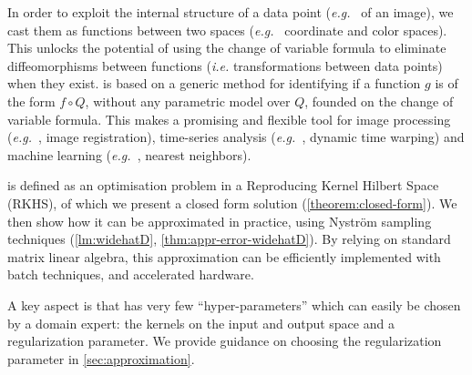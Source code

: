 In order to exploit the internal structure of a data point (\emph{e.g.\ } of an image), we cast them as functions between two spaces (\emph{e.g.\ } coordinate and color spaces). This unlocks the potential of using the change of variable formula to eliminate diffeomorphisms between functions (\emph{i.e.} transformations between data points) when they exist. \Diffy is based on a generic method for identifying if a function $g$ is of the form $f\circ Q$, without any parametric model over $Q$, founded on the change of variable formula. This makes \Diffy a promising and flexible tool for image processing (\emph{e.g.\ }, image registration), time-series analysis (\emph{e.g.\ }, dynamic time warping) and machine learning (\emph{e.g.\ }, nearest neighbors).

\Diffy is defined as an optimisation problem in a Reproducing Kernel Hilbert Space (RKHS), of which we present a closed form solution
(\cref{theorem:closed-form}).
We then show how it can be approximated in practice, using Nyström sampling techniques (\cref{lm:widehatD}, \cref{thm:appr-error-widehatD}). By relying on standard matrix linear algebra, this approximation can be efficiently implemented with batch techniques, and accelerated hardware.

A key aspect is that \Diffy has very few ``hyper-parameters'' which can easily be chosen by a domain expert: the kernels on the input and output space and a regularization parameter. We provide guidance on choosing the regularization parameter in \cref{sec:approximation}.



